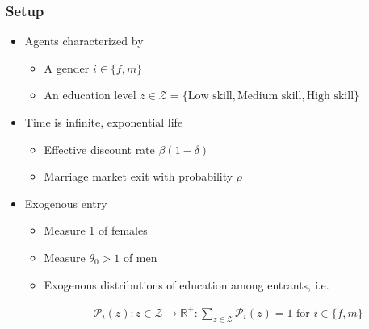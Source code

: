 \documentclass{beamer}
\begin{document}
\begin{frame}
\frametitle{Setup}

\begin{itemize}
	\item Agents characterized by
	\begin{itemize}
		\item A gender $i\in\{f,m\}$
		\item An education level $z\in\mathcal{Z}=\{\text{Low skill},\text{Medium skill},\text{High skill}\}$ 
	\end{itemize} 
	\item Time is infinite, exponential life
	\begin{itemize}
		\item Effective discount rate $\beta\left(1-\delta\right)$
		\item Marriage market exit with probability $\rho$
	\end{itemize}
	\item Exogenous entry
	\begin{itemize}
		\item Measure 1 of females
		\item Measure $\theta_0>1$ of men
		\item Exogenous distributions of education among entrants, i.e.
		
		\begin{align*}
		\mathcal{P}_i(z):z\in\mathcal{Z}\to \mathbb{R}^+ : \sum_{z\in\mathcal{Z}} \mathcal{P}_i(z) = 1 \text{ for } i\in\{f,m\}
		\end{align*}
	\end{itemize}
\end{itemize}
\end{frame}
\end{document}

